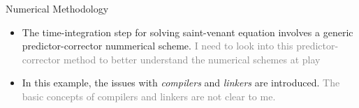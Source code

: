 \documentclass[12pt]{beamer}
\begin{document}
\begin{frame}{Numerical Methodology}
\begin{itemize}
\item The time-integration step for solving saint-venant equation involves a generic predictor-corrector nummerical scheme. \textcolor{gray}{I need to look into this predictor-corrector method to better understand the numerical schemes at play}
\vspace{5mm}
\item In this example, the issues with \textit{compilers} and \textit{linkers} are introduced. \textcolor{gray}{The basic concepts of compilers and linkers are not clear to me.}
\end{itemize}
\end{frame}
\end{document}
